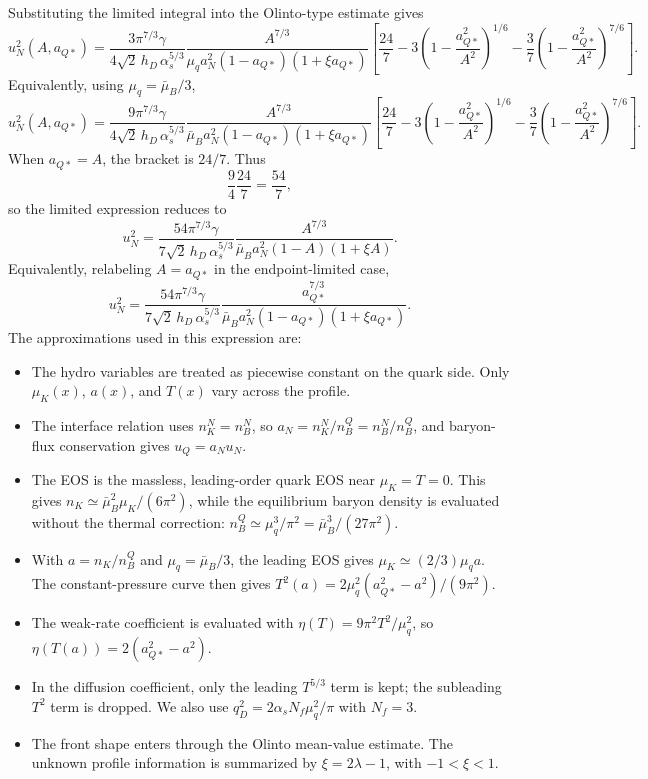 Substituting the limited integral into the Olinto-type estimate gives
\begin{equation}
u_N^2(A,a_{Q*})
=
\frac{
3\pi^{7/3}\gamma
}{
4\sqrt{2}\,h_D\,\alpha_s^{5/3}
}
\frac{
A^{7/3}
}{
\mu_q a_N^2(1-a_{Q*})(1+\xi a_{Q*})
}
\left[
\frac{24}{7}
-3\left(1-\frac{a_{Q*}^2}{A^2}\right)^{1/6}
-\frac{3}{7}
\left(1-\frac{a_{Q*}^2}{A^2}\right)^{7/6}
\right].
\end{equation}
Equivalently, using \(\mu_q=\bar\mu_B/3\),
\begin{equation}
u_N^2(A,a_{Q*})
=
\frac{
9\pi^{7/3}\gamma
}{
4\sqrt{2}\,h_D\,\alpha_s^{5/3}
}
\frac{
A^{7/3}
}{
\bar\mu_B a_N^2(1-a_{Q*})(1+\xi a_{Q*})
}
\left[
\frac{24}{7}
-3\left(1-\frac{a_{Q*}^2}{A^2}\right)^{1/6}
-\frac{3}{7}
\left(1-\frac{a_{Q*}^2}{A^2}\right)^{7/6}
\right].
\end{equation}
When \(a_{Q*}=A\), the bracket is \(24/7\). Thus
\begin{equation}
\frac{9}{4}\frac{24}{7}
=
\frac{54}{7},
\end{equation}
so the limited expression reduces to
\begin{equation}
u_N^2
=
\frac{
54\pi^{7/3}\gamma
}{
7\sqrt{2}\,h_D\,\alpha_s^{5/3}
}
\frac{
A^{7/3}
}{
\bar\mu_B a_N^2(1-A)(1+\xi A)
}.
\end{equation}
Equivalently, relabeling \(A=a_{Q*}\) in the endpoint-limited case,
\begin{equation}
u_N^2
=
\frac{
54\pi^{7/3}\gamma
}{
7\sqrt{2}\,h_D\,\alpha_s^{5/3}
}
\frac{
a_{Q*}^{7/3}
}{
\bar\mu_B a_N^2(1-a_{Q*})(1+\xi a_{Q*})
}.
\end{equation}
The approximations used in this expression are:
\begin{itemize}
\item The hydro variables are treated as piecewise constant on the quark side.
Only \(\mu_K(x)\), \(a(x)\), and \(T(x)\) vary across the profile.
\item The interface relation uses \(n_K^N=n_B^N\), so
\(a_N=n_K^N/n_B^Q=n_B^N/n_B^Q\), and baryon-flux conservation gives
\(u_Q=a_Nu_N\).
\item The EOS is the massless, leading-order quark EOS near
\(\mu_K=T=0\). This gives
\(n_K\simeq \bar\mu_B^2\mu_K/(6\pi^2)\), while the equilibrium baryon
density is evaluated without the thermal correction:
\(n_B^Q\simeq \mu_q^3/\pi^2=\bar\mu_B^3/(27\pi^2)\).
\item With \(a=n_K/n_B^Q\) and \(\mu_q=\bar\mu_B/3\), the leading EOS gives
\(\mu_K\simeq (2/3)\mu_qa\). The constant-pressure curve then gives
\(T^2(a)=2\mu_q^2(a_{Q*}^2-a^2)/(9\pi^2)\).
\item The weak-rate coefficient is evaluated with
\(\eta(T)=9\pi^2T^2/\mu_q^2\), so
\(\eta(T(a))=2(a_{Q*}^2-a^2)\).
\item In the diffusion coefficient, only the leading \(T^{5/3}\) term is kept;
the subleading \(T^2\) term is dropped. We also use
\(q_D^2=2\alpha_sN_f\mu_q^2/\pi\) with \(N_f=3\).
\item The front shape enters through the Olinto mean-value estimate. The
unknown profile information is summarized by \(\xi=2\lambda-1\), with
\(-1<\xi<1\).
\end{itemize}

